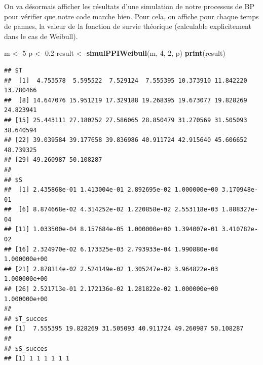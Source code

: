 \documentclass[
]{article}
\newenvironment{Shaded}{\begin{snugshade}}{\end{snugshade}}
\newcommand{\DecValTok}[1]{\textcolor[rgb]{0.00,0.00,0.81}{#1}}
\newcommand{\FloatTok}[1]{\textcolor[rgb]{0.00,0.00,0.81}{#1}}
\newcommand{\FunctionTok}[1]{\textcolor[rgb]{0.13,0.29,0.53}{\textbf{#1}}}
\newcommand{\NormalTok}[1]{#1}
\newcommand{\OtherTok}[1]{\textcolor[rgb]{0.56,0.35,0.01}{#1}}
\begin{document}
On va désormais afficher les résultats d'une simulation de notre
processus de BP pour vérifier que notre code marche bien. Pour cela, on
affiche pour chaque temps de pannes, la valeur de la fonction de survie
théorique (calculable explicitement dans le cas de Weibull).

\begin{Shaded}
\begin{Highlighting}[]
\NormalTok{m }\OtherTok{\textless{}{-}} \DecValTok{5}
\NormalTok{p }\OtherTok{\textless{}{-}} \FloatTok{0.2}
\NormalTok{result }\OtherTok{\textless{}{-}} \FunctionTok{simulPPIWeibull}\NormalTok{(m, }\DecValTok{4}\NormalTok{, }\DecValTok{2}\NormalTok{, p)}
\FunctionTok{print}\NormalTok{(result)}
\end{Highlighting}
\end{Shaded}

\begin{verbatim}
## $T
##  [1]  4.753578  5.595522  7.529124  7.555395 10.373910 11.842220 13.780466
##  [8] 14.647076 15.951219 17.329188 19.268395 19.673077 19.828269 24.823941
## [15] 25.443111 27.180252 27.586065 28.850479 31.270569 31.505093 38.640594
## [22] 39.039584 39.177658 39.836986 40.911724 42.915640 45.606652 48.739325
## [29] 49.260987 50.108287
## 
## $S
##  [1] 2.435868e-01 1.413004e-01 2.892695e-02 1.000000e+00 3.170948e-01
##  [6] 8.874668e-02 4.314252e-02 1.220858e-02 2.553118e-03 1.888327e-04
## [11] 1.033500e-04 8.157684e-05 1.000000e+00 1.394007e-01 3.410782e-02
## [16] 2.324970e-02 6.173325e-03 2.793933e-04 1.990880e-04 1.000000e+00
## [21] 2.878114e-02 2.524149e-02 1.305247e-02 3.964822e-03 1.000000e+00
## [26] 2.521713e-01 2.172136e-02 1.281822e-02 1.000000e+00 1.000000e+00
## 
## $T_succes
## [1]  7.555395 19.828269 31.505093 40.911724 49.260987 50.108287
## 
## $S_succes
## [1] 1 1 1 1 1 1
\end{verbatim}
\end{document}
